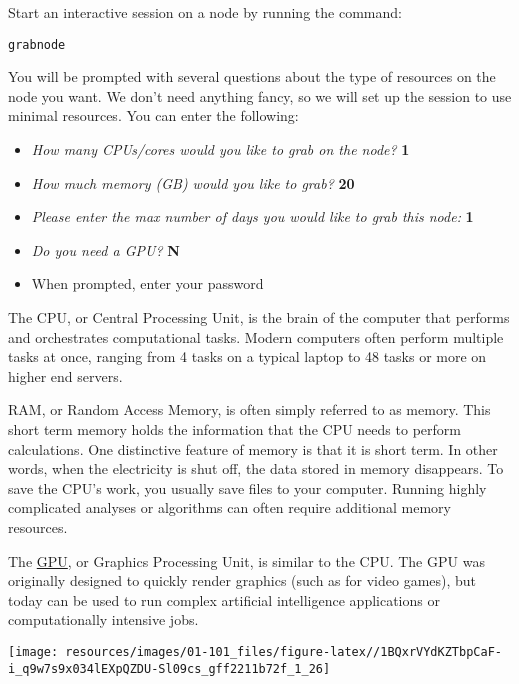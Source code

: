 \documentclass[
]{book}
\providecommand{\tightlist}{%
  \setlength{\itemsep}{0pt}\setlength{\parskip}{0pt}}
\begin{document}
Start an interactive session on a node by running the command:

\begin{verbatim}
grabnode
\end{verbatim}

You will be prompted with several questions about the type of resources on the node you want. We don't need anything fancy, so we will set up the session to use minimal resources. You can enter the following:

\begin{itemize}
\tightlist
\item
  \emph{How many CPUs/cores would you like to grab on the node?} \textbf{1}
\item
  \emph{How much memory (GB) would you like to grab?} \textbf{20}
\item
  \emph{Please enter the max number of days you would like to grab this node:} \textbf{1}
\item
  \emph{Do you need a GPU?} \textbf{N}
\item
  When prompted, enter your password
\end{itemize}

The CPU, or Central Processing Unit, is the brain of the computer that performs and orchestrates computational tasks. Modern computers often perform multiple tasks at once, ranging from 4 tasks on a typical laptop to 48 tasks or more on higher end servers.

RAM, or Random Access Memory, is often simply referred to as memory. This short term memory holds the information that the CPU needs to perform calculations. One distinctive feature of memory is that it is short term. In other words, when the electricity is shut off, the data stored in memory disappears. To save the CPU's work, you usually save files to your computer. Running highly complicated analyses or algorithms can often require additional memory resources.

The \href{https://www.intel.com/content/www/us/en/products/docs/processors/what-is-a-gpu.html}{GPU}, or Graphics Processing Unit, is similar to the CPU. The GPU was originally designed to quickly render graphics (such as for video games), but today can be used to run complex artificial intelligence applications or computationally intensive jobs.

\begin{center}\texttt{[image: resources/images/01-101\_files/figure-latex//1BQxrVYdKZTbpCaF-i\_q9w7s9x034lEXpQZDU-Sl09cs\_gff2211b72f\_1\_26]} \end{center}
\end{document}
